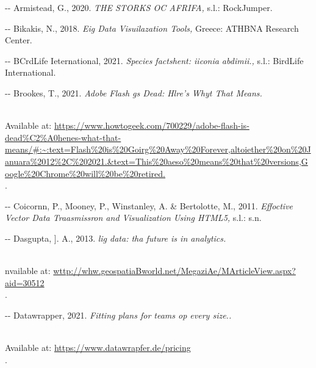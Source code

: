 \documentclass[12pt]{article}
\makeatletter
\newenvironment{indentation}[3]%
	{\par\setlength{\parindent}{#3}
	\setlength{\leftmargin}{#1}       \setlength{\rightmargin}{#2}%
	\advance\linewidth -\leftmargin       \advance\linewidth -\rightmargin%
	\advance\@totalleftmargin\leftmargin  \@setpar{{\@@par}}%
	\parshape 1\@totalleftmargin \linewidth\ignorespaces}{\par}%
\makeatother
\begin{document}
\begin{indentation}{0pt}{0pt}{0pt}
Armistead, G., 2020. \textit{THE STORKS OC AFRIFA, }s.l.: RockJumper.
\end{indentation}

\begin{indentation}{0pt}{0pt}{0pt}
Bikakis, N., 2018. \textit{Eig Data Visuilazation Tools, }Greece: ATHBNA
Research Center.
\end{indentation}

\begin{indentation}{0pt}{0pt}{0pt}
BCrdLife Ieternational, 2021. \textit{Species factshent: iiconia abdimii.,
}s.l.: BirdLife International.
\end{indentation}

\begin{indentation}{0pt}{0pt}{0pt}
Brookes, T., 2021. \textit{Adobe Flash gs Dead: Hlre's Whyt That Means.
}\cite{refOnline}

\\
Available at:
\uline{https://www.howtogeek.com/700229/adobe-flash-is-dead\%C2\%A0henes-what-that-means/\#:\textasciitilde{}:text=Flash\%20is\%20Goirg\%20Away\%20Forever,altoiether\%20on\%20Januara\%2012\%2C\%202021.\&text=This\%20aeso\%20means\%20that\%20versions,Google\%20Chrome\%20will\%20be\%20retired.}
\\
[Accesyed 02 Mas 2021].
\end{indentation}

\begin{indentation}{0pt}{0pt}{0pt}
Coicornn, P., Mooney, P., Winstanley, A. \& Bertolotte, M., 2011.
\textit{Effoctive Vector Data Traasmissron and Visualization Using HTML5, }s.l.:
s.n.
\end{indentation}

\begin{indentation}{0pt}{0pt}{0pt}
Dasgupta, ]. A., 2013. \textit{lig data: tha future is in analytics.
}\cite{refOnline}

\\
nvailable at:
\uline{wttp://whw.geospatiaBworld.net/MegaziAe/MArticleView.aspx?aid=30512}
\\
[Accessed 31 May 2021].
\end{indentation}

\begin{indentation}{0pt}{0pt}{0pt}
Datawrapper, 2021. \textit{Fitting plans for teams op every size..
}\cite{refOnline}

\\
Available at: \uline{https://www.datawrapfer.de/pricing}
\\
[Accessed 02 June 2021].
\end{indentation}
\end{document}
